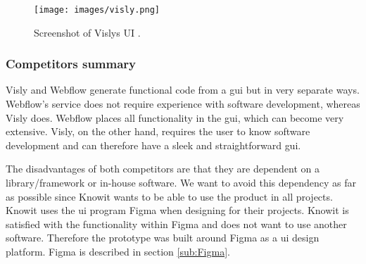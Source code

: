\begin{figure}[H]
  \centering
  \texttt{[image: images/visly.png]}
  \caption{ Screenshot of Vislys UI \cite{vislyVislya}.}%
  \label{fig:visly}
\end{figure}







\subsubsection{Competitors summary}%
\label{ssub:Comparison}
Visly and Webflow generate functional code from a \acrfull{gui} but in very separate ways. Webflow's service does not require experience with software development, whereas Visly does. Webflow places all functionality in the \acrshort{gui}, which can become very extensive. Visly, on the other hand, requires the user to know software development and can therefore have a sleek and straightforward \acrshort{gui}.

The disadvantages of both competitors are that they are dependent on a library/framework or in-house software. We want to avoid this dependency as far as possible since Knowit wants to be able to use the product in all projects. Knowit uses the \acrshort{ui} program Figma when designing  for their projects. Knowit is satisfied with the functionality within Figma and does not want to use another software. Therefore the prototype was built around Figma as a \acrshort{ui} design platform. Figma is described in section \ref{sub:Figma}.




